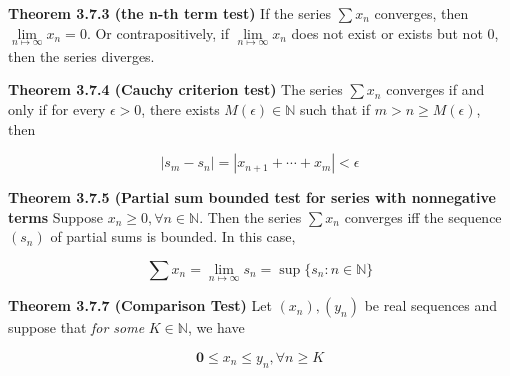 \documentclass[10pt,landscape]{article}
\begin{document}
\begin{multicols}{4}





\textbf{Theorem 3.7.3 (the n-th term test)} If the series $\sum x_n$ converges, then $\underset{n \mapsto \infty}{\lim} x_n = 0$. Or contrapositively, if $\underset{n \mapsto \infty}{\lim} x_n$ does not exist or exists but not 0, then the series diverges.

\textbf{Theorem 3.7.4 (Cauchy criterion test)} The series $\sum x_n$ converges if and only if for every $\epsilon > 0$, there exists $M(\epsilon) \in \mathbb{N}$ such that if $m > n \geq M(\epsilon)$, then 

$$
|s_m - s_n| = |x_{n+1} + \cdots + x_m| < \epsilon
$$

\textbf{Theorem 3.7.5 (Partial sum bounded test for series with nonnegative terms} Suppose $x_n \geq 0, \forall n \in \mathbb{N}$. Then the series $\sum x_n$ converges iff the sequence $(s_n)$ of partial sums is bounded. In this case,

$$
\sum x_n = \underset{n \mapsto \infty}{\lim} s_n = \sup\{ s_n : n \in \mathbb{N} \}
$$

\textbf{Theorem 3.7.7 (Comparison Test)} Let $(x_n), (y_n)$ be real sequences and suppose that \textit{for some} $K \in \mathbb{N}$, we have

$$
\mathbf{0 \mathbf{\leq}} x_n \mathbf{\leq} y_n, \forall n \geq K
$$


\end{multicols}
\end{document}
